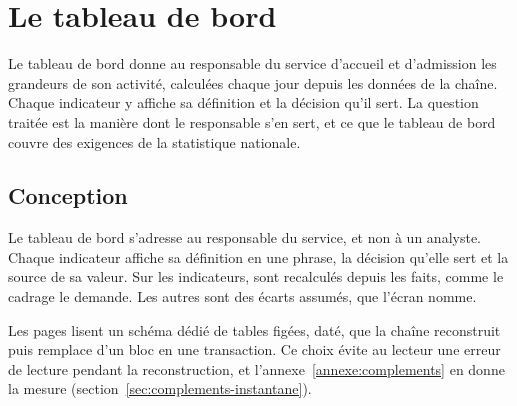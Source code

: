 
\chapter{Le tableau de bord}\label{chap:tableau-de-bord}

Le tableau de bord donne au responsable du service d'accueil et d'admission les grandeurs de son
activité, calculées chaque jour depuis les données de la chaîne. Chaque indicateur y affiche sa
définition et la décision qu'il sert. La question traitée est la manière dont le responsable s'en
sert, et ce que le tableau de bord couvre des exigences de la statistique nationale.

\section{Conception}

Le tableau de bord s'adresse au responsable du service, et non à un analyste. Chaque indicateur
affiche sa définition en une phrase, la décision qu'elle sert et la source de sa valeur.
Sur les  indicateurs,  sont
recalculés depuis les faits, comme le cadrage le demande. Les autres sont des écarts assumés, que l'écran
nomme.

Les pages lisent un schéma dédié de tables figées, daté, que la chaîne reconstruit puis remplace
d'un bloc en une transaction. Ce choix évite au lecteur une erreur de lecture pendant la
reconstruction, et l'annexe~\ref{annexe:complements} en donne la mesure
(section~\ref{sec:complements-instantane}).

